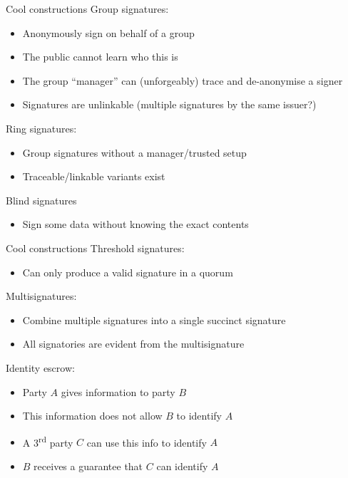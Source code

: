 \begin{frame}{Cool constructions}
  \pause
  Group signatures:
  \begin{itemize}
    \item Anonymously sign on behalf of a group
    \item The public cannot learn who this is
    \item The group \enquote{manager} can (unforgeably) trace and de-anonymise a signer
    \item Signatures are unlinkable (multiple signatures by the same issuer?)
  \end{itemize}

  \pause
  Ring signatures:
  \begin{itemize}
    \item Group signatures without a manager/trusted setup
    \item Traceable/linkable variants exist
  \end{itemize}

  \pause
  Blind signatures
  \begin{itemize}
    \item Sign some data without knowing the exact contents
  \end{itemize}
\end{frame}

\begin{frame}{Cool constructions}
  \pause
  Threshold signatures:
  \begin{itemize}
    \item Can only produce a valid signature in a quorum
  \end{itemize}

  \pause
  Multisignatures:
  \begin{itemize}
    \item Combine multiple signatures into a single succinct signature
    \item All signatories are evident from the multisignature
  \end{itemize}

  \pause
  Identity escrow:
  \begin{itemize}
    \item Party $A$ gives information to party $B$
    \item This information does not allow $B$ to identify $A$
    \item A 3\textsuperscript{rd} party $C$ can use this info to identify $A$
    \item $B$ receives a guarantee that $C$ can identify $A$
  \end{itemize}
\end{frame}

